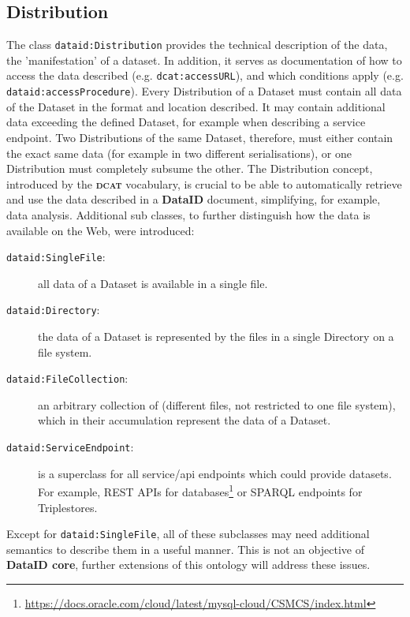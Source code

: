 \documentclass[a4paper,english,twoside,BCOR1.5cm,headsepline,DIV12,appendixprefix,final,12pt]{scrbook}
\newcommand{\dataid}{{\ttfamily\bfseries DataID}\xspace}
\newcommand{\core}{{\ttfamily\bfseries DataID core}\xspace}
\newcommand{\dcat}{{\scshape\bfseries dcat}\xspace}
\newcommand{\prop}[1]{{{\texttt{#1}}}}
\newcommand\footnoteurl[1]{\footnote{\scriptsize\url{#1}}}
\begin{document}
\subsection{Distribution} 
\label{sec:coredist}

The class \prop{dataid:Distribution} provides the technical description of the data, the 'manifestation' of a dataset. In addition, it serves as documentation of how to access the data described (e.g. \prop{dcat:accessURL}), and which conditions apply (e.g. \prop{dataid:accessProcedure}). Every Distribution of a Dataset must contain all data of the Dataset in the format and location described. It may contain additional data exceeding the defined Dataset, for example when describing a service endpoint. Two Distributions of the same Dataset, therefore, must either contain the exact same data (for example in two different serialisations), or one Distribution must completely subsume the other. The Distribution concept, introduced by the \dcat vocabulary, is crucial to be able to automatically retrieve and use the data described in a \dataid document, simplifying, for example, data analysis. Additional sub classes, to further distinguish how the data is available on the Web, were introduced:

\begin{description}
\item[\prop{dataid:SingleFile}:] all data of a Dataset is available in a single file.
\item[\prop{dataid:Directory}:] the data of a Dataset is represented by the files in a single Directory on a file system.
\item[\prop{dataid:FileCollection}:] an arbitrary collection of (different files, not restricted to one file system), which in their accumulation represent the data of a Dataset.
\item[\prop{dataid:ServiceEndpoint}:] is a superclass for all service/api endpoints which could provide datasets. For example, REST APIs for databases\footnoteurl{https://docs.oracle.com/cloud/latest/mysql-cloud/CSMCS/index.html} or SPARQL endpoints for Triplestores.
\end{description}

Except for \prop{dataid:SingleFile}, all of these subclasses may need additional semantics to describe them in a useful manner. This is not an objective of \core, further extensions of this ontology will address these issues.
\end{document}

